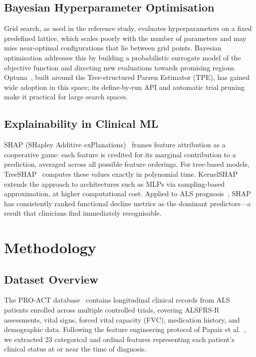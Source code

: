 \documentclass[a4paper,twoside]{article}
\begin{document}
\subsection{Bayesian Hyperparameter Optimisation}

Grid search, as used in the reference study, evaluates hyperparameters on a fixed
predefined lattice, which scales poorly with the number of parameters and may miss
near-optimal configurations that lie between grid points. Bayesian optimisation
addresses this by building a probabilistic surrogate model of the objective
function and directing new evaluations towards promising regions. Optuna~\cite{optuna2019}, built around the Tree-structured Parzen Estimator
(TPE), has gained wide adoption in this space; its define-by-run API and
automatic trial pruning make it practical for large search spaces.

\subsection{Explainability in Clinical ML}

SHAP (SHapley Additive exPlanations)~\cite{lundberg2017shap} frames feature
attribution as a cooperative game: each feature is credited for its marginal
contribution to a prediction, averaged across all possible feature orderings.
For tree-based models, TreeSHAP~\cite{lundberg2020treeshap} computes these values
exactly in polynomial time. KernelSHAP extends the approach to architectures such
as MLPs via sampling-based approximation, at higher computational cost. Applied
to ALS prognosis~\cite{Anani2023}, SHAP has consistently ranked functional decline
metrics as the dominant predictors---a result that clinicians find immediately
recognisable.


\section{Methodology}
\label{sec:methodology}

\subsection{Dataset Overview}

The PRO-ACT database~\cite{PROACT} contains longitudinal clinical records from
ALS patients enrolled across multiple controlled trials, covering ALSFRS-R
assessments, vital signs, forced vital capacity (FVC), medication history, and
demographic data. Following the feature engineering protocol of
Papaiz et al.~\cite{Papaiz2024}, we extracted 23 categorical and ordinal
features representing each patient's clinical status at or near the time of
diagnosis.
\end{document}
